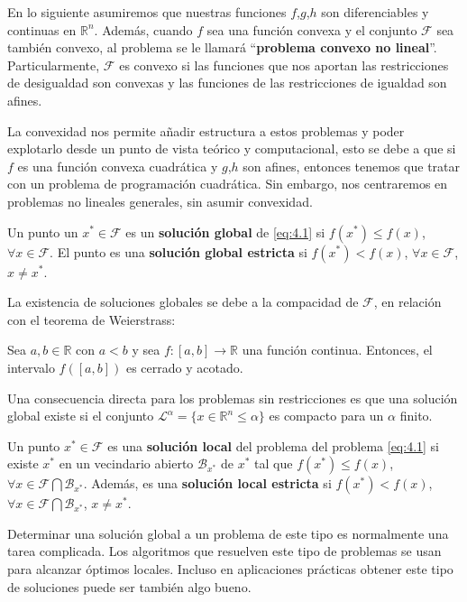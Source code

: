 En lo siguiente asumiremos que nuestras funciones $f$,$g$,$h$ son diferenciables y continuas en $\mathbb{R}^n$. 
Además, cuando $f$ sea una función convexa y el conjunto $\mathcal{F}$ sea también convexo, al problema se le llamará ``\textbf{problema convexo no lineal}''. 
Particularmente, $\mathcal{F}$ es convexo si las funciones que nos aportan las restricciones de desigualdad son convexas y las funciones de las restricciones de igualdad son afines.

La convexidad nos permite añadir estructura a estos problemas y poder explotarlo desde un punto de vista teórico y computacional, esto se debe a que si $f$ es una función convexa cuadrática y $g$,$h$ son afines, entonces tenemos que tratar con un problema de programación cuadrática. 
Sin embargo, nos centraremos en problemas no lineales generales, sin asumir convexidad.

\begin{definicion}
Un punto un $x^*\in\mathcal{F}$ es un \textbf{solución global} de \ref{eq:4.1} si $f(x^*)\leq f(x)$, $\forall x\in\mathcal{F}$. El punto es una \textbf{solución global estricta} si $f(x^*) < f(x)$, $\forall x\in\mathcal{F}$, $x\neq x^*$.
\end{definicion}

La existencia de soluciones globales se debe a la compacidad de $\mathcal{F}$, en relación con el teorema de Weierstrass:

\begin{teorema}
Sea $a,b\in\mathbb{R}$ con $a<b$ y sea $f:[a,b]\xrightarrow{}{}\mathbb{R}$ una función continua. 
Entonces, el intervalo $f([a,b])$ es cerrado y acotado.
\end{teorema}

Una consecuencia directa para los problemas sin restricciones es que una solución global existe si el conjunto $\mathcal{L}^\alpha = \{x\in\mathbb{R}^n\leq\alpha\}$ es compacto para un $\alpha$ finito. 

\begin{definicion}
Un punto $x^*\in\mathcal{F}$ es una \textbf{solución local} del problema del problema \ref{eq:4.1} si existe $x^*$ en un vecindario abierto $\mathcal{B}_{x^*}$ de $x^*$ tal que $f(x^*)\leq f(x)$, $\forall x\in \mathcal{F}\bigcap\mathcal{B}_{x^*}$. 
Además, es una \textbf{solución local estricta} si $f(x^*)<f(x)$, $\forall x\in\mathcal{F}\bigcap\mathcal{B}_{x^*}$, $x\neq x^*$.
\end{definicion}

Determinar una solución global a un problema de este tipo es normalmente una tarea complicada. 
Los algoritmos que resuelven este tipo de problemas se usan para alcanzar óptimos locales. 
Incluso en aplicaciones prácticas obtener este tipo de soluciones puede ser también algo bueno. 

